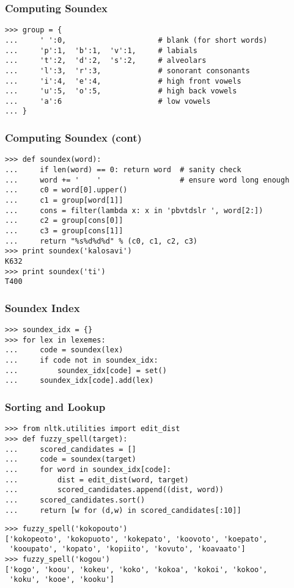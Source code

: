 \documentclass{beamer}             %
\begin{document}
\begin{frame}[fragile]
\frametitle{Computing Soundex}
\scriptsize

\begin{verbatim}
>>> group = {
...     ' ':0,                     # blank (for short words)
...     'p':1,  'b':1,  'v':1,     # labials
...     't':2,  'd':2,  's':2,     # alveolars
...     'l':3,  'r':3,             # sonorant consonants
...     'i':4,  'e':4,             # high front vowels
...     'u':5,  'o':5,             # high back vowels
...     'a':6                      # low vowels
... }
\end{verbatim}
\end{frame}

\begin{frame}[fragile]
\frametitle{Computing Soundex (cont)}
\scriptsize

\begin{verbatim}
>>> def soundex(word):
...     if len(word) == 0: return word  # sanity check
...     word += '    '                  # ensure word long enough
...     c0 = word[0].upper()
...     c1 = group[word[1]]
...     cons = filter(lambda x: x in 'pbvtdslr ', word[2:])
...     c2 = group[cons[0]]
...     c3 = group[cons[1]]
...     return "%s%d%d%d" % (c0, c1, c2, c3)
>>> print soundex('kalosavi')
K632
>>> print soundex('ti')
T400
\end{verbatim}
\end{frame}

\begin{frame}[fragile]
\frametitle{Soundex Index}
\begin{verbatim}
>>> soundex_idx = {}
>>> for lex in lexemes:
...     code = soundex(lex)
...     if code not in soundex_idx:
...         soundex_idx[code] = set()
...     soundex_idx[code].add(lex)
\end{verbatim}
\end{frame}

\begin{frame}[fragile]
\frametitle{Sorting and Lookup}
\scriptsize
\begin{verbatim}
>>> from nltk.utilities import edit_dist
>>> def fuzzy_spell(target):
...     scored_candidates = []
...     code = soundex(target)
...     for word in soundex_idx[code]:
...         dist = edit_dist(word, target)
...         scored_candidates.append((dist, word))
...     scored_candidates.sort()
...     return [w for (d,w) in scored_candidates[:10]]
\end{verbatim}

\begin{verbatim}
>>> fuzzy_spell('kokopouto')
['kokopeoto', 'kokopuoto', 'kokepato', 'koovoto', 'koepato',
 'kooupato', 'kopato', 'kopiito', 'kovuto', 'koavaato']
>>> fuzzy_spell('kogou')
['kogo', 'koou', 'kokeu', 'koko', 'kokoa', 'kokoi', 'kokoo',
 'koku', 'kooe', 'kooku']
\end{verbatim}
\end{frame}
\end{document}
